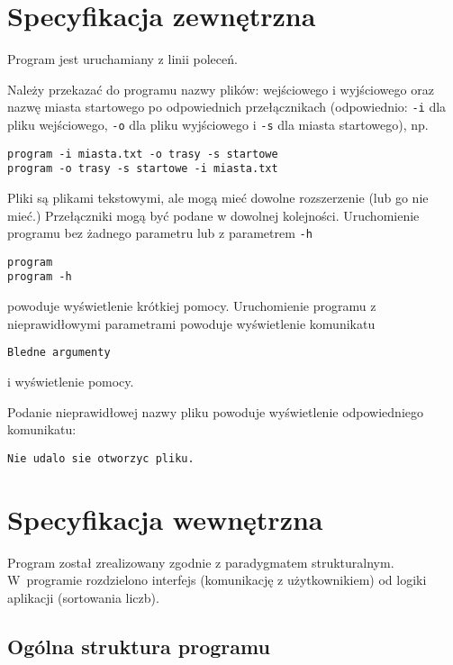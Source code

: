 \documentclass[12pt,a4paper,twoside]{article}
\begin{document}
\section{Specyfikacja zewnętrzna}
\label{sec:sp:zewnetrzna}
Program jest uruchamiany z linii poleceń. 

Należy przekazać do programu nazwy plików: wejściowego i wyjściowego oraz nazwę miasta startowego po odpowiednich przełącznikach (odpowiednio: \texttt{-i} dla pliku wejściowego, \texttt{-o} dla pliku wyjściowego i \texttt{-s} dla miasta startowego), np.
\begin{verbatim}
program -i miasta.txt -o trasy -s startowe
program -o trasy -s startowe -i miasta.txt 
\end{verbatim}
Pliki są plikami tekstowymi, ale mogą mieć dowolne rozszerzenie (lub go nie mieć.) Przełączniki mogą być podane w dowolnej kolejności. Uruchomienie programu bez żadnego parametru lub z parametrem \texttt{-h}
\begin{verbatim}
program 
program -h
\end{verbatim}
powoduje wyświetlenie krótkiej pomocy. Uruchomienie programu z nieprawidłowymi parametrami powoduje wyświetlenie komunikatu 
\begin{verbatim}
Bledne argumenty
\end{verbatim}
i wyświetlenie pomocy. 

Podanie nieprawidłowej nazwy pliku powoduje wyświetlenie odpowiedniego komunikatu:
\begin{verbatim}
Nie udalo sie otworzyc pliku.
\end{verbatim}


\section{Specyfikacja wewnętrzna}\label{sec:sp-wew}
 Program został zrealizowany zgodnie z paradygmatem strukturalnym.  
W~programie rozdzielono interfejs (komunikację z użytkownikiem) od logiki aplikacji (sortowania liczb).


\subsection{Ogólna struktura programu}
\end{document}
